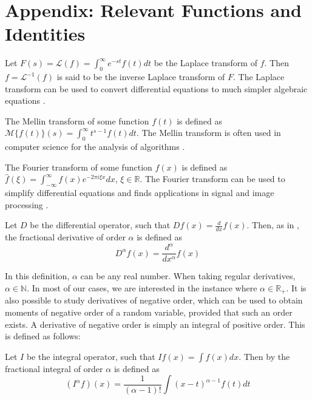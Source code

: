 \section{Appendix: Relevant Functions and Identities}\label{s:appendices}

\begin{definition}\label{def:laplace}
    Let \(\displaystyle F(s) = \mathcal{L}(f) = \int_{0}^{\infty}e^{-st} f(t) dt\) be the Laplace transform of \(f\). Then \(f = \mathcal{L}^{-1}(f)\) is said to be the inverse Laplace transform of \(F\). The Laplace transform can be used to convert differential equations to much simpler algebraic equations \citep{thiagarajan2022}.
\end{definition}

\begin{definition}\label{def:mellin}
    The Mellin transform of some function \(f(t)\) is defined as \(\mathcal{M}\{f(t)\}(s) = \displaystyle \int_{0}^{\infty} t^{s-1} f(t) dt\). The Mellin transform is often used in computer science for the analysis of algorithms \citep{flajolet1996}.
\end{definition}

\begin{definition}\label{def:fourier}
    The Fourier transform of some function \(f(x)\) is defined as \(\displaystyle \hat{f}(\xi) = \int_{-\infty}^{\infty} f(x) e^{-2 \pi i \xi x}dx\), \(\xi \in \mathbb{R}\). The Fourier transform can be used to simplify differential equations and finds applications in signal and image processing \citep{fourier1822}. 
    
\end{definition}

\begin{definition}
    Let \(D\) be the differential operator, such that \(D f(x) = \frac{d}{dx} f(x)\). Then, as in \citet{samko1993}, the fractional derivative of order \(\alpha\) is defined as \[D^{\alpha} f(x) = \frac{d^{\alpha}}{dx^{\alpha}} f(x)\]
    
\end{definition}
In this definition, \(\alpha\) can be any real number. When taking regular derivatives, \(\alpha \in \mathbb{N}\). In most of our cases, we are interested in the instance where  \(\alpha \in \mathbb{R}_+\). It is also possible to study derivatives of negative order, which can be used to obtain moments of negative order of a random variable, provided that such an order exists. A derivative of negative order is simply an integral of positive order. This is defined as follows:
\begin{definition}
    Let \(I\) be the integral operator, such that \(I f(x) = \int f(x) dx\). Then by \citet{cauchy1823} the fractional integral of order \(\alpha\) is defined as \[(I^{\alpha} f) (x) = \frac{1}{(\alpha-1)!}\int (x-t)^{\alpha-1} f(t) dt\]
\end{definition} 

